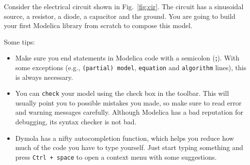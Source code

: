 \documentclass[10pt,a4paper]{article}
\begin{document}
Consider the electrical circuit shown in Fig.~\ref{fig:cir}. The circuit has a 
sinusoidal source, a resistor, a diode, a capacitor and the ground. You are 
going to build your first Modelica library from scratch to compose this model.

Some tips:
\begin{itemize}
	\item Make sure you end statements in Modelica code with a semicolon 
	(\textbf{;}). With some exceptions (e.g., \texttt{(partial) model}, 
	\texttt{equation} and \texttt{algorithm} lines), this is always necessary.
	\item You can \texttt{check} your model using the check box in the toolbar. 
	This will usually point you to possible mistakes you made, so make sure to 
	read error and warning messages carefully. Although Modelica has a bad 
	reputation for debugging, its syntax checker is not bad.
	\item Dymola has a nifty autocompletion function, which helps you reduce 
	how much of the code you have to type yourself. Just start typing something 
	and press \texttt{Ctrl + space} to open a context menu with some 
	suggestions.
\end{itemize}
\end{document}
